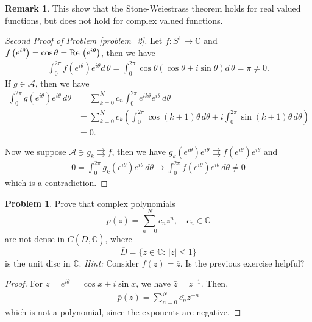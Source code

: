 \documentclass[11pt]{article}
\theoremstyle{definition}
\newtheorem{problem}{Problem}
\newtheorem{remark}{Remark}[problem]
\theoremstyle{definition}
\begin{document}
\begin{remark}
This show that the Stone-Weiestrass theorem holds for real valued functions, but does not hold for complex valued functions.
\end{remark}

\medskip

\begin{proof}[Second Proof of Problem \ref{problem_2}]
Let $f:S^1 \to \mathbb{C}$ and $f\left(e^{i\theta} \right) = \cos \theta = {\rm Re}\, \left(e^{i\theta} \right)$, then we have
\begin{align*}
    \int^{2\pi}_0 f\left(e^{i\theta} \right)e^{i\theta} d\, \theta = \int^{2\pi}_0 \cos \theta (\cos \theta + i \sin \theta) d\, \theta = \pi \neq 0.
\end{align*}
If $g\in \mathcal{A}$, then we have 
\begin{align*}
    \int_0^{2\pi} g\left(e^{i\theta}\right)e^{i\theta}\, d\theta & = \sum^N_{k=0} c_n \int^{2\pi}_0 e^{ik\theta} e^{i\theta} \, d\theta \\
    & = \sum^N_{k=0} c_k \left(\int^{2\pi}_0 \cos(k+1)\theta \, d\theta + i \int^{2\pi}_0 \sin(k+1)\theta \, d\theta \right) \\
    & = 0.
\end{align*}

Now we suppose $\mathcal{A}\ni g_k \rightrightarrows f$, then we have $g_k\left(e^{i\theta}\right) e^{i\theta} \rightrightarrows f\left(e^{i\theta}\right) e^{i\theta}$ and 
\begin{align*}
    0 = \int^{2\pi}_0 g_k\left(e^{i\theta}\right) e^{i\theta} \, d\theta \to \int^{2\pi}_0 f\left(e^{i\theta}\right) e^{i\theta} \, d\theta \neq 0
\end{align*}
which is a contradiction. 
\end{proof}

\medskip


\begin{problem}\label{problem_3}
Prove that complex polynomials
$$
p(z) = \sum_{n=0}^N c_n z^n,
\quad
c_n\in\mathbb{C}
$$
are not dense in $C(\overline{D},\mathbb{C})$, where
$$
\overline{D} = \{ z\in\mathbb{C}:\, |z|\leq 1\}
$$
is the unit disc in $\mathbb{C}$.
{\em Hint:} Consider $f(z)=\overline{z}$. Is the previous exercise
helpful?
\end{problem}
\begin{proof}
For $z = e^{i\theta} = \cos x + i\sin x$, we have $\bar{z} = z^{-1}$. Then, 
\begin{align*}
    \bar{p}(z) = \sum^N_{n=0} \bar{c_n} z^{-n}
\end{align*}
which is not a polynomial, since the exponents are negative.
\end{proof}
\end{document}
